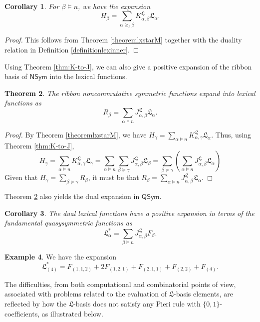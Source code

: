 \documentclass{amsart}
\newtheorem{theorem}{Theorem}[section]
\newtheorem{corollary}[theorem]{Corollary}
\theoremstyle{definition}
\newtheorem{example}[theorem]{Example}
\newcommand{\lx}{\mathfrak{L}}
\begin{document}
\begin{corollary}\label{Htolex}
 For $\beta \vDash n$, we have the expansion \[H_{\beta} = \sum_{\alpha 
 \geq_{\ell} \beta} K^{\lx}_{\alpha, \beta} \lx_{\alpha}.\]
\end{corollary}

\begin{proof}
 This follows from Theorem \ref{theoremlxstarM} together with the duality relation in Definition \ref{definitionlexinner}. 
\end{proof}

  Using  Theorem \ref{thm:K-to-J}, we can also give a positive expansion of the ribbon basis of $\textsf{NSym}$ into the lexical functions.

\begin{theorem}\label{Rtolex}
 The ribbon noncommutative symmetric functions expand into lexical functions as 
 \[R_{\beta} = \sum_{\alpha \models n} J^{\lx}_{\alpha, \beta} \lx_{\alpha}.\]
\end{theorem}

\begin{proof}
 By Theorem \ref{theoremlxstarM}, we have $H_{\gamma} = \sum_{\alpha \models n} K^{\lx}_{\alpha, \gamma} \lx_{\alpha}$. Thus, using Theorem \ref{thm:K-to-J},
 \[H_{\gamma} = \sum_{\alpha \models n} K^{\lx}_{\alpha,\gamma} \lx_{\gamma} = 
 \sum_{\alpha \models n} \sum_{\beta \succeq \gamma} J^{\lx}_{\alpha, \beta} \lx_{\beta} = \sum_{\beta \succeq \gamma} \left( \sum_{\alpha \models n} J^{\lx}_{\alpha, \beta}\lx_{\alpha} \right)\]
 Given that $H_{\gamma} = \sum_{\beta \succeq \gamma} R_{\beta}$, it must be that $R_{\beta} = \sum_{\alpha \models n} J^{\lx}_{\alpha, \beta}\lx_{\alpha}$.
\end{proof}

 Theorem \ref{Rtolex}  also yields the dual expansion in $\textsf{QSym}$.

\begin{corollary}
 The dual lexical functions have a positive expansion in terms of the fundamental quasysymmetric functions as \[ \lx^*_{\alpha}= \sum_{\beta \models n} J^{\lx}_{\alpha,\beta}F_{\beta}.\]
\end{corollary}

\begin{example}
 We have the expansion \[ \lx^*_{(4)} = F_{(1,1,2)} + 2F_{(1,2,1)} + F_{(2,1,1)} + F_{(2,2)} + F_{(4)}.\]
\end{example}

 The difficulties, from both computational and combinatorial points of view, 
 associated with problems related to the evaluation of $\lx$-basis elements, are reflected by how
 the $\lx$-basis
 does not satisfy any Pieri rule with $\{ 0, 1 \}$-coefficients, as illustrated below. 
\end{document}
